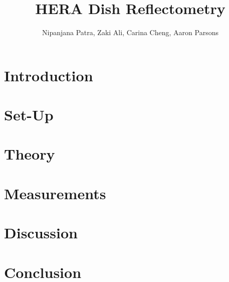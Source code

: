 \documentclass[12pt,preprint]{aastex}
\begin{document}
\title{HERA Dish Reflectometry} 
\author{Nipanjana Patra, Zaki Ali, Carina Cheng, Aaron Parsons}
\maketitle

\section{Introduction}

\section{Set-Up}

\section{Theory}

\section{Measurements}

\section{Discussion}

\section{Conclusion}
\end{document}
